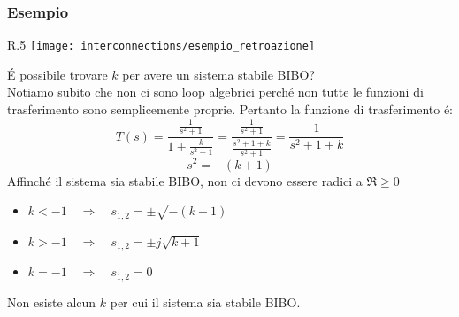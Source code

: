 \documentclass[../main.tex]{subfiles}
\begin{document}
	\subsubsection*{Esempio}
	\begin{wrapfigure}{R}{.5\linewidth}%
		\centering
		\texttt{[image: interconnections/esempio\_retroazione]}%
	\end{wrapfigure}
	\leavevmode%
	\'E possibile trovare $ k $ per avere un sistema stabile BIBO?\\
	Notiamo subito che non ci sono loop algebrici perch\'e non tutte le funzioni di trasferimento sono semplicemente proprie. Pertanto la funzione di trasferimento \'e:
	\[ T(s) = \frac{\frac{1}{s^2+1}}{1+\frac{k}{s^2+1}} = \frac{\frac{1}{s^2+1}}{\frac{s^2+1+k}{s^2+1}} = \frac{1}{s^2+1+k} \]
	\[ s^2 = -(k+1) \]
	Affinch\'e il sistema sia stabile BIBO, non ci devono essere radici a $ \Re \geq 0 $
	\begin{itemize}
		\item $ k<-1 \quad \Rightarrow \quad s_{1,2} = \pm \sqrt{-(k+1)} $
		\item $ k>-1 \quad \Rightarrow \quad s_{1,2} = \pm j \sqrt{k+1} $
		\item $ k=-1 \quad \Rightarrow \quad s_{1,2} = 0 $
	\end{itemize}
	Non esiste alcun $ k $ per cui il sistema sia stabile BIBO.
	
\end{document}
